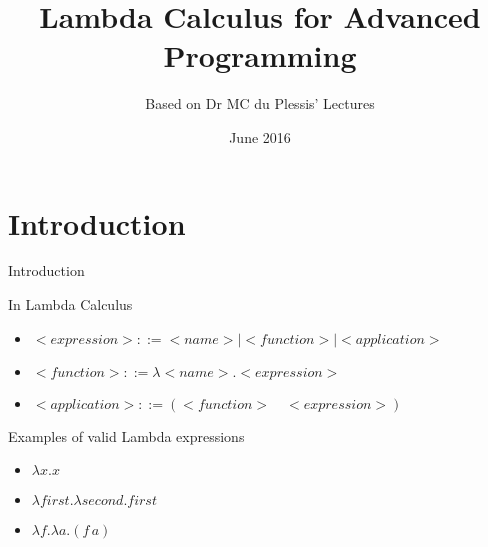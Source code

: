 \documentclass{beamer}
\title[Your Short Title]{Lambda Calculus for Advanced Programming}
\author{Based on Dr MC du Plessis' Lectures}
\date{June 2016}
\begin{document}
\begin{frame}
  \titlepage
\end{frame}


\section{Introduction}

\begin{frame}{Introduction}

\begin{block}{In Lambda Calculus}
  \begin{itemize}
    \item $<expression>::=<name>|<function>|<application>$
    \item $<function>::=\lambda<name>.<expression>$
    \item $<application>::=(<function> \quad <expression>)$
  \end{itemize}
\end{block}

\begin{block}{Examples of valid Lambda expressions}
  \begin{itemize}
    \item $\lambda x.x$
    \item $\lambda first. \lambda second . first$
    \item $\lambda f . \lambda a . (f \, a)$
  \end{itemize}
\end{block}

\end{frame}
\end{document}
